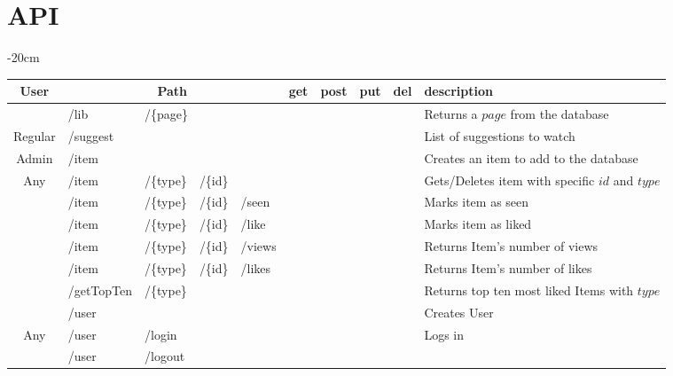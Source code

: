 \documentclass[oneside]{article}
\newcommand{\xmark}{\ding{53}} %
\begin{document}
\section{API}
\label{sec:api}
\begin{table}[H]
  \centering
  \addtolength{\leftskip} {-20cm}
  \addtolength{\rightskip}{-20cm}
  \begin{adjustbox}{width=1.6\textwidth}
  \begin{tabular}{ c|l l l l|c|c|c|c|l }
    \rowcolor{Gray}
    User & \multicolumn{4}{c|}{Path} & get & post & put & del & description 
    \\ \hline
    & /lib & \multicolumn{3}{l|}{/\{page\}} &
    \xmark & & & &
    Returns a $page$ from the database
    \\
    \multirow{-2}{*}{Regular} & 
    \multicolumn{4}{l|}{/suggest} &
     & \xmark & & &
    List of suggestions to watch
    \\ \hhline{-|----|-|-|-|-|~} \rowcolor{Gray}
    Admin & /item & & & &
    & \xmark & & &
    Creates an item to add to the database
    \\ \hhline{-|----|-|-|-|-|~}
    Any &
    /item & /\{type\} & /\{id\} & &
    \xmark & & & \xmark &
    Gets/Deletes item with specific $id$ and $type$ 
    \\ \hhline{-|----|-|-|-|-|~} \rowcolor{Gray}
    & /item & /\{type\} & /\{id\} & /seen &
    & & \xmark & &
    Marks item as seen
    \\ \rowcolor{Gray}
    \multirow{-2}{*}{Regular}
    & /item & /\{type\} & /\{id\} & /like &
    & & \xmark & &
    Marks item as liked
    \\ \hhline{-|----|-|-|-|-|~}
    & /item & /\{type\} & /\{id\} & /views &
    \xmark & & & &
    Returns Item's number of views
    \\
    & /item & /\{type\} & /\{id\} & /likes &
    \xmark & & & &
    Returns Item's number of likes
    \\ 
    & /getTopTen & /\{type\} &  &  &
    \xmark & & & &
    Returns top ten most liked Items with $type$
    \\ 
    & \multicolumn{4}{l|}{/user} &
    & \xmark & & &
    Creates User
    \\
    \multirow{-5}{*}{Any} 
    & /user & \multicolumn{3}{l|}{/login} &
    \xmark & & & &
    Logs in
    \\ \hhline{-|----|-|-|-|-|~} \rowcolor{Gray}
    & /user & \multicolumn{3}{l|}{/logout} &

\end{tabular}
\end{adjustbox}
\end{table}
\end{document}
